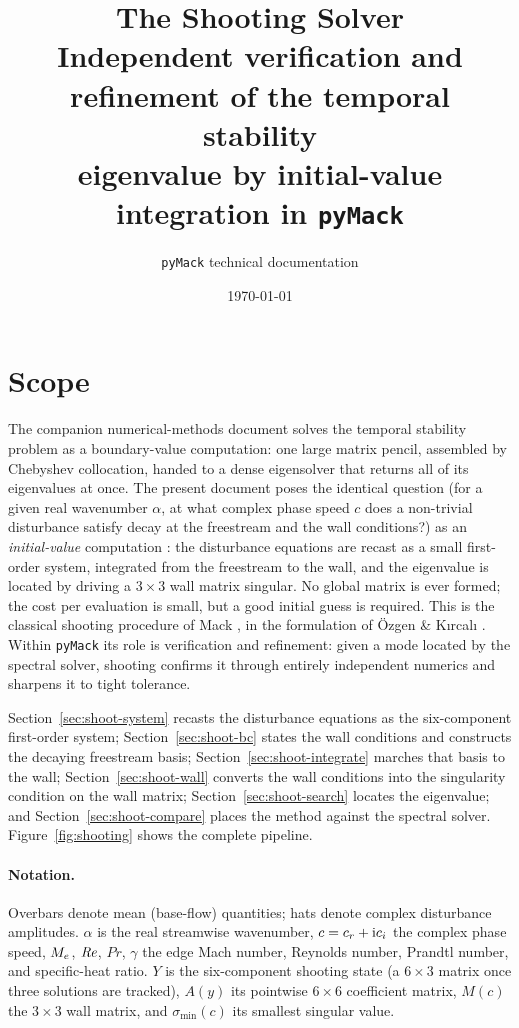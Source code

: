 \documentclass[11pt]{article}
\title{\textbf{The Shooting Solver}\\[3pt]
\large Independent verification and refinement of the temporal stability\\
eigenvalue by initial-value integration in \texttt{pyMack}}
\author{\texttt{pyMack} technical documentation}
\date{\today}
\begin{document}
\maketitle
\tableofcontents
\bigskip

\section{Scope}\label{sec:scope}
The companion numerical-methods document solves the temporal stability problem as a boundary-value
computation: one large matrix pencil, assembled by Chebyshev collocation, handed to a dense
eigensolver that returns all of its eigenvalues at once. The present document poses the identical
question (for a given real wavenumber $\alpha$, at what complex phase speed $c$ does a non-trivial
disturbance satisfy decay at the freestream and the wall conditions?) as an \emph{initial-value}
computation \cite{malik1990}: the disturbance equations are recast as a small first-order system,
integrated from the freestream to the wall, and the eigenvalue is located by driving a $3\times3$
wall matrix singular. No global matrix is ever formed; the cost per evaluation is small, but a good
initial guess is required. This is the classical shooting procedure of Mack \cite{mack1984}, in the
formulation of \"Ozgen \& K{\i}rcal{\i} \cite{ozgen2008}. Within \texttt{pyMack} its role is
verification and refinement: given a mode located by the spectral solver, shooting confirms it
through entirely independent numerics and sharpens it to tight tolerance.

Section~\ref{sec:shoot-system} recasts the disturbance equations as the six-component first-order
system; Section~\ref{sec:shoot-bc} states the wall conditions and constructs the decaying
freestream basis; Section~\ref{sec:shoot-integrate} marches that basis to the wall;
Section~\ref{sec:shoot-wall} converts the wall conditions into the singularity condition on the
wall matrix; Section~\ref{sec:shoot-search} locates the eigenvalue; and
Section~\ref{sec:shoot-compare} places the method against the spectral solver.
Figure~\ref{fig:shooting} shows the complete pipeline.

\paragraph{Notation.} Overbars denote mean (base-flow) quantities; hats denote complex disturbance
amplitudes. $\alpha$ is the real streamwise wavenumber, $c=c_r+\mathrm{i} c_i$ the complex phase speed,
$M_e$, $\mathit{Re}$, $\mathit{Pr}$, $\gamma$ the edge Mach number, Reynolds number, Prandtl number, and
specific-heat ratio. $Y$ is the six-component shooting state (a $6\times3$ matrix once three
solutions are tracked), $A(y)$ its pointwise $6\times6$ coefficient matrix, $M(c)$ the $3\times3$
wall matrix, and $\sigma_{\min}(c)$ its smallest singular value.
\end{document}
